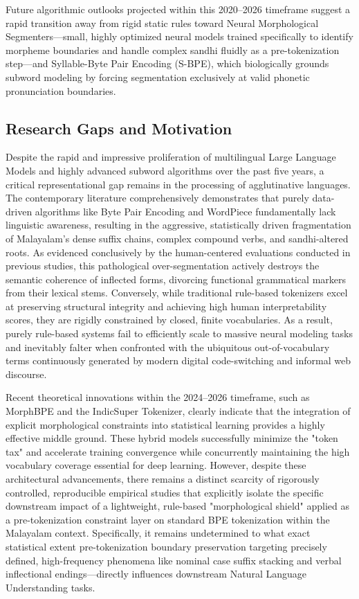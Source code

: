 \documentclass[12pt]{article}
\begin{document}
	Future algorithmic outlooks projected within this 2020–2026 timeframe suggest a rapid transition away from rigid static rules toward Neural Morphological Segmenters—small, highly optimized neural models trained specifically to identify morpheme boundaries and handle complex sandhi fluidly as a pre-tokenization step—and Syllable-Byte Pair Encoding (S-BPE), which biologically grounds subword modeling by forcing segmentation exclusively at valid phonetic pronunciation boundaries. 
	
	\subsection{Research Gaps and Motivation }
	
	Despite the rapid and impressive proliferation of multilingual Large Language Models and highly advanced subword algorithms over the past five years, a critical representational gap remains in the processing of agglutinative languages. The contemporary literature comprehensively demonstrates that purely data-driven algorithms like Byte Pair Encoding and WordPiece fundamentally lack linguistic awareness, resulting in the aggressive, statistically driven fragmentation of Malayalam’s dense suffix chains, complex compound verbs, and sandhi-altered roots. As evidenced conclusively by the human-centered evaluations conducted in previous studies, this pathological over-segmentation actively destroys the semantic coherence of inflected forms, divorcing functional grammatical markers from their lexical stems. Conversely, while traditional rule-based tokenizers excel at preserving structural integrity and achieving high human interpretability scores, they are rigidly constrained by closed, finite vocabularies. As a result, purely rule-based systems fail to efficiently scale to massive neural modeling tasks and inevitably falter when confronted with the ubiquitous out-of-vocabulary terms continuously generated by modern digital code-switching and informal web discourse. \cite{}
	
	Recent theoretical innovations within the 2024–2026 timeframe, such as MorphBPE and the IndicSuper Tokenizer, clearly indicate that the integration of explicit morphological constraints into statistical learning provides a highly effective middle ground. These hybrid models successfully minimize the "token tax" and accelerate training convergence while concurrently maintaining the high vocabulary coverage essential for deep learning. However, despite these architectural advancements, there remains a distinct scarcity of rigorously controlled, reproducible empirical studies that explicitly isolate the specific downstream impact of a lightweight, rule-based "morphological shield" applied as a pre-tokenization constraint layer on standard BPE tokenization within the Malayalam context. Specifically, it remains undetermined to what exact statistical extent pre-tokenization boundary preservation targeting precisely defined, high-frequency phenomena like nominal case suffix stacking and verbal inflectional endings—directly influences downstream Natural Language Understanding tasks. 
	
\end{document}
